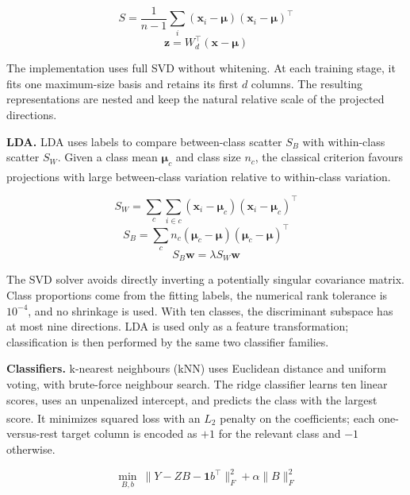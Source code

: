 \documentclass[11pt,a4paper]{article}
\newcommand{\supcite}[1]{\textsuperscript{\cite{#1}}}
\newcommand{\method}[1]{\textbf{#1}}
\begin{document}
\begin{equation}
S = \frac{1}{n-1}\sum_i
(\mathbf{x}_i-\boldsymbol{\mu})(\mathbf{x}_i-\boldsymbol{\mu})^\top
\end{equation}
\begin{equation}
\mathbf{z} = W_d^\top(\mathbf{x}-\boldsymbol{\mu})
\end{equation}

The implementation uses full SVD without whitening. At each training stage, it fits one maximum-size basis and retains its first $d$ columns. The resulting representations are nested and keep the natural relative scale of the projected directions.

\method{LDA.} LDA uses labels to compare between-class scatter $S_B$ with within-class scatter $S_W$. Given a class mean $\boldsymbol{\mu}_c$ and class size $n_c$, the classical criterion favours projections with large between-class variation relative to within-class variation.\supcite{lda}

\begin{equation}
S_W = \sum_c\sum_{i\in c}
(\mathbf{x}_i-\boldsymbol{\mu}_c)(\mathbf{x}_i-\boldsymbol{\mu}_c)^\top
\end{equation}
\begin{equation}
S_B = \sum_c n_c
(\boldsymbol{\mu}_c-\boldsymbol{\mu})(\boldsymbol{\mu}_c-\boldsymbol{\mu})^\top
\end{equation}
\begin{equation}
S_B\mathbf{w} = \lambda S_W\mathbf{w}
\end{equation}

The SVD solver avoids directly inverting a potentially singular covariance matrix. Class proportions come from the fitting labels, the numerical rank tolerance is $10^{-4}$, and no shrinkage is used. With ten classes, the discriminant subspace has at most nine directions. LDA is used only as a feature transformation; classification is then performed by the same two classifier families.

\method{Classifiers.} k-nearest neighbours (kNN) uses Euclidean distance and uniform voting, with brute-force neighbour search. The ridge classifier learns ten linear scores, uses an unpenalized intercept, and predicts the class with the largest score.\supcite{ridge} It minimizes squared loss with an $L_2$ penalty on the coefficients; each one-versus-rest target column is encoded as $+1$ for the relevant class and $-1$ otherwise.

\begin{equation}
\min_{B,b}\ \lVert Y-ZB-\mathbf{1}b^\top\rVert_F^2
+\alpha\lVert B\rVert_F^2
\end{equation}
\end{document}
